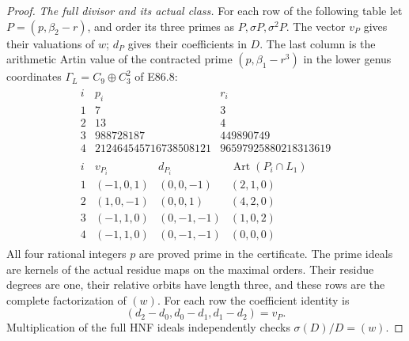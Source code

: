 \begin{proof}
\emph{The full divisor and its actual class.}
For each row of the following table let
\(P=(p,\beta_2-r)\), and order its three primes
as \(P,\sigma P,\sigma^2P\).
The vector \(v_P\) gives their valuations of \(w\);
\(d_P\) gives their coefficients in \(D\).
The last column is the arithmetic Artin value of
the contracted prime
\((p,\beta_1-r^3)\) in the lower genus coordinates
\(\Gamma_L=C_9\oplus C_3^2\) of E86.8:
\[
 \begin{gathered}
 \begin{array}{c|r|r}
 i&p_i&r_i\\ \hline
 1&7&3\\
 2&13&4\\
 3&988728187&449890749\\
 4&212464545716738508121&96597925880218313619
 \end{array}\\[3pt]
 \begin{array}{c|c|c|c}
 i&v_{P_i}&d_{P_i}&\operatorname{Art}(P_i\cap L_1)\\ \hline
 1&(-1,0,1)&(0,0,-1)&(2,1,0)\\
 2&(1,0,-1)&(0,0,1)&(4,2,0)\\
 3&(-1,1,0)&(0,-1,-1)&(1,0,2)\\
 4&(-1,1,0)&(0,-1,-1)&(0,0,0)
 \end{array}
 \end{gathered}
 \tag{E97.10}
\]
All four rational integers \(p\) are proved prime in the
certificate. The prime ideals are kernels of the actual
residue maps on the maximal orders. Their residue degrees
are one, their relative orbits have length three, and
these rows are the complete factorization of \((w)\).
For each row the coefficient identity is
\[
   (d_2-d_0,d_0-d_1,d_1-d_2)=v_P .
 \tag{E97.11}
\]
Multiplication of the full HNF ideals independently
checks \(\sigma(D)/D=(w)\).


\end{proof}
